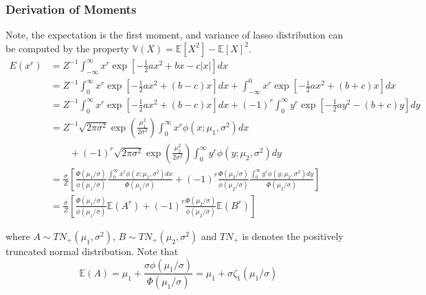 \subsubsection{Derivation of Moments}
Note, the expectation is the first moment, and variance of lasso distribution can be computed by the property $\mathbb{V}(X) = \mathbb{E}[X^2]- \mathbb{E}[X]^2$.
\begin{equation}
	\begin{array}{rl}
		E(x^r)
		&  = Z^{-1} \int_{-\infty}^\infty x^r \exp\left[ -\tfrac{1}{2}ax^2 + bx - c|x| \right] dx
		\\ [2ex]
		& 
		= Z^{-1}  \int_0^\infty   x^r \exp\left[ -\tfrac{1}{2}ax^2 + (b - c)x \right] dx
		+ \int_{-\infty}^0 x^r \exp\left[ -\tfrac{1}{2}ax^2 + (b + c)x \right] dx
		\\ [2ex]
		& 
		=  Z^{-1}  \int_0^\infty x^r \exp\left[ -\tfrac{1}{2}ax^2 + (b - c)x \right] dx
		+ (-1)^r\int_0^\infty y^r \exp\left[ -\tfrac{1}{2}ay^2 - (b + c)y \right] dy
		\\ [2ex]
		& 
		= Z^{-1}  \sqrt{2\pi\sigma^2}
		\exp\left(  \frac{\mu_1^2}{2\sigma^2} \right) \int_0^\infty x^r \phi(x;\mu_1,\sigma^2) dx
		\\ [2ex]
		&  \qquad + (-1)^r    \sqrt{2\pi\sigma^2}   \exp\left(  \frac{\mu_2^2}{2\sigma^2} \right) \int_0^\infty y^r \phi(y;\mu_2,\sigma^2) dy
		
		\\ [2ex]
		& 
		= \frac{\sigma}{Z} \left[  
		\frac{\Phi(\mu_1/\sigma)}{\phi(\mu_1/\sigma)} \frac{\int_0^\infty x^r \phi(x;\mu_1,\sigma^2) dx}{\Phi(\mu_1/\sigma)}
		+ (-1)^r  \frac{\Phi(\mu_2/\sigma)}{\phi(\mu_2/\sigma)}  \frac{\int_0^\infty y^r \phi(y;\mu_2,\sigma^2) dy}{\Phi(\mu_2/\sigma)}
		\right] 
		
		\\ [4ex]
		& 
		= \frac{\sigma}{Z} \left[  
		\frac{\Phi(\mu_1/\sigma)}{\phi(\mu_1/\sigma)} 
		\mathbb{E}( A^r )
		+ (-1)^r  \frac{\Phi(\mu_2/\sigma)}{\phi(\mu_2/\sigma)}  \mathbb{E}( B^r )
		\right] 
	\end{array} 
	\label{eq:LassoMoment}
\end{equation}





\noindent where $A\sim TN_+(\mu_1,\sigma^2)$, $B\sim TN_+(\mu_2,\sigma^2)$ and $TN_+$ is denotes the positively truncated normal distribution.
Note that
$$
\mathbb{E}(A) = \mu_1 + \frac{\sigma \phi(\mu_1/\sigma)}{\Phi(\mu_1/\sigma)} = \mu_1 + \sigma \zeta_1(\mu_1/\sigma)
$$

